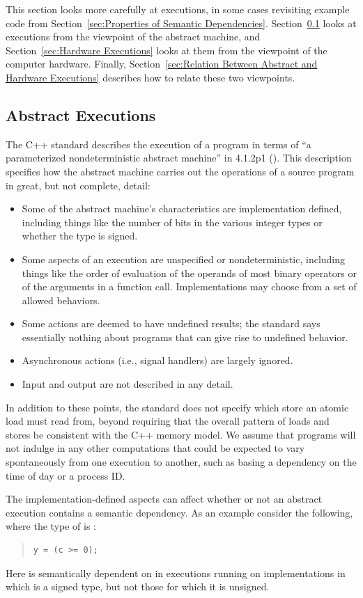\documentclass[10]{article}
\begin{document}
This section looks more carefully at executions, in some cases revisiting
example code from
Section~\ref{sec:Properties of Semantic Dependencies}.
Section~\ref{sec:Abstract Executions}
looks at executions from the viewpoint of the abstract machine, and
Section~\ref{sec:Hardware Executions}
looks at them from the viewpoint of the computer hardware.
Finally,
Section~\ref{sec:Relation Between Abstract and Hardware Executions}
describes how to relate these two viewpoints.

\subsection{Abstract Executions}
\label{sec:Abstract Executions}

The C++ standard describes the execution of a program in terms of
``a parameterized nondeterministic abstract machine'' in 4.1.2p1
().
This description specifies how the abstract machine carries out the
operations of a source program in great, but not complete, detail:
\begin{itemize}
\item	Some of the abstract machine's characteristics are
	implementation defined, including things like the number of
	bits in the various integer types
	or whether the  type is signed.
\item	Some aspects of an execution are unspecified or nondeterministic,
	including things like the order of evaluation of the operands
	of most binary operators or of the arguments in a function call.
	Implementations may choose from a set of allowed behaviors.
\item	Some actions are deemed to have undefined results; the standard
	says essentially nothing about programs that can give rise to
	undefined behavior.
\item	Asynchronous actions (i.e., signal handlers) are largely ignored.
\item	Input and output are not described in any detail.
\end{itemize}
In addition to these points, the standard does not specify which store
an atomic load must read from, beyond requiring that the overall
pattern of loads and stores be consistent with the C++ memory model.
We assume that programs will not indulge in any other computations that
could be expected to vary spontaneously from one execution to another,
such as basing a dependency on the time of day or a process ID.

The implementation-defined aspects can affect whether or not an
abstract execution contains a semantic dependency.
As an example consider the following, where the type of  is :
\begin{quote}
\begin{verbatim}
y = (c >= 0);
\end{verbatim}
\end{quote}
Here  is semantically dependent on  in executions
running on implementations in
which  is a signed type,
but not those for which it is unsigned.
\end{document}
